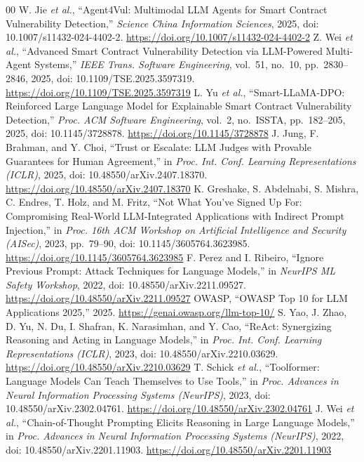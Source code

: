 \documentclass[conference]{IEEEtran}
\begin{document}
\begin{thebibliography}{00}
 W. Jie \textit{et al.}, ``Agent4Vul: Multimodal LLM Agents for Smart Contract Vulnerability Detection,'' \textit{Science China Information Sciences}, 2025, doi: 10.1007/s11432-024-4402-2. \url{https://doi.org/10.1007/s11432-024-4402-2}
 Z. Wei \textit{et al.}, ``Advanced Smart Contract Vulnerability Detection via LLM-Powered Multi-Agent Systems,'' \textit{IEEE Trans. Software Engineering}, vol.\ 51, no.\ 10, pp.\ 2830--2846, 2025, doi: 10.1109/TSE.2025.3597319. \url{https://doi.org/10.1109/TSE.2025.3597319}
 L. Yu \textit{et al.}, ``Smart-LLaMA-DPO: Reinforced Large Language Model for Explainable Smart Contract Vulnerability Detection,'' \textit{Proc. ACM Software Engineering}, vol.\ 2, no.\ ISSTA, pp.\ 182--205, 2025, doi: 10.1145/3728878. \url{https://doi.org/10.1145/3728878}
 J. Jung, F. Brahman, and Y. Choi, ``Trust or Escalate: LLM Judges with Provable Guarantees for Human Agreement,'' in \textit{Proc. Int. Conf. Learning Representations (ICLR)}, 2025, doi: 10.48550/arXiv.2407.18370. \url{https://doi.org/10.48550/arXiv.2407.18370}
 K. Greshake, S. Abdelnabi, S. Mishra, C. Endres, T. Holz, and M. Fritz, ``Not What You've Signed Up For: Compromising Real-World LLM-Integrated Applications with Indirect Prompt Injection,'' in \textit{Proc. 16th ACM Workshop on Artificial Intelligence and Security (AISec)}, 2023, pp.\ 79--90, doi: 10.1145/3605764.3623985. \url{https://doi.org/10.1145/3605764.3623985}
 F. Perez and I. Ribeiro, ``Ignore Previous Prompt: Attack Techniques for Language Models,'' in \textit{NeurIPS ML Safety Workshop}, 2022, doi: 10.48550/arXiv.2211.09527. \url{https://doi.org/10.48550/arXiv.2211.09527}
 OWASP, ``OWASP Top 10 for LLM Applications 2025,'' 2025. \url{https://genai.owasp.org/llm-top-10/}
 S. Yao, J. Zhao, D. Yu, N. Du, I. Shafran, K. Narasimhan, and Y. Cao, ``ReAct: Synergizing Reasoning and Acting in Language Models,'' in \textit{Proc. Int. Conf. Learning Representations (ICLR)}, 2023, doi: 10.48550/arXiv.2210.03629. \url{https://doi.org/10.48550/arXiv.2210.03629}
 T. Schick \textit{et al.}, ``Toolformer: Language Models Can Teach Themselves to Use Tools,'' in \textit{Proc. Advances in Neural Information Processing Systems (NeurIPS)}, 2023, doi: 10.48550/arXiv.2302.04761. \url{https://doi.org/10.48550/arXiv.2302.04761}
 J. Wei \textit{et al.}, ``Chain-of-Thought Prompting Elicits Reasoning in Large Language Models,'' in \textit{Proc. Advances in Neural Information Processing Systems (NeurIPS)}, 2022, doi: 10.48550/arXiv.2201.11903. \url{https://doi.org/10.48550/arXiv.2201.11903}

\end{thebibliography}
\end{document}
